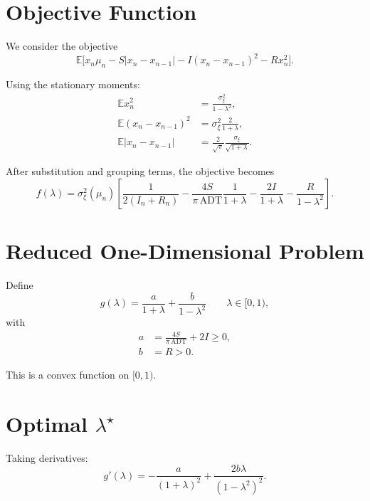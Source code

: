 \documentclass[11pt]{article}
\begin{document}
\section{Objective Function}

We consider the objective
\begin{equation}
\mathbb E \Big[
x_n \mu_n
- S |x_n - x_{n-1}|
- I (x_n - x_{n-1})^2
- R x_n^2
\Big].
\end{equation}

Using the stationary moments:
\begin{align}
\mathbb E x_n^2 &= \frac{\sigma_\xi^2}{1-\lambda^2}, \\
\mathbb E (x_n - x_{n-1})^2
&= \sigma_\xi^2 \frac{2}{1+\lambda}, \\
\mathbb E |x_n - x_{n-1}|
&= \frac{2}{\sqrt{\pi}} \frac{\sigma_\xi}{\sqrt{1+\lambda}}.
\end{align}

After substitution and grouping terms, the objective becomes
\begin{equation}
f(\lambda)
= \sigma_\xi^2(\mu_n)
\left[
\frac{1}{2(I_n + R_n)}
- \frac{4S}{\pi\,\mathrm{ADT}} \frac{1}{1+\lambda}
- \frac{2I}{1+\lambda}
- \frac{R}{1-\lambda^2}
\right].
\end{equation}

\section{Reduced One-Dimensional Problem}

Define
\begin{equation}
\boxed{
g(\lambda)
= \frac{a}{1+\lambda}
+ \frac{b}{1-\lambda^2}
}
\qquad \lambda \in [0,1),
\end{equation}
with
\begin{align}
a &= \frac{4S}{\pi\,\mathrm{ADT}} + 2I \ge 0, \\
b &= R > 0.
\end{align}

This is a convex function on \([0,1)\).

\section{Optimal \(\lambda^\star\)}

Taking derivatives:
\begin{equation}
g'(\lambda)
= -\frac{a}{(1+\lambda)^2}
+ \frac{2b\lambda}{(1-\lambda^2)^2}.
\end{equation}
\end{document}
